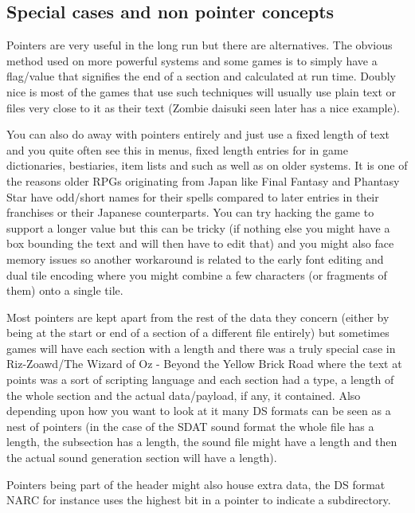\documentclass[
]{book}
\begin{document}
\hypertarget{special-cases-and-non-pointer-concepts}{%
\subsection{Special cases and non pointer concepts}\label{special-cases-and-non-pointer-concepts}}

Pointers are very useful in the long run but there are alternatives. The obvious method used on more powerful systems and some games is to simply have a flag/value that signifies the end of a section and calculated at run time. Doubly nice is most of the games that use such techniques will usually use plain text or files very close to it as their text (Zombie daisuki seen later has a nice example).

You can also do away with pointers entirely and just use a fixed length of text and you quite often see this in menus, fixed length entries for in game dictionaries, bestiaries, item lists and such as well as on older systems. It is one of the reasons older RPGs originating from Japan like Final Fantasy and Phantasy Star have odd/short names for their spells compared to later entries in their franchises or their Japanese counterparts. You can try hacking the game to support a longer value but this can be tricky (if nothing else you might have a box bounding the text and will then have to edit that) and you might also face memory issues so another workaround is related to the early font editing and dual tile encoding where you might combine a few characters (or fragments of them) onto a single tile.

Most pointers are kept apart from the rest of the data they concern (either by being at the start or end of a section of a different file entirely) but sometimes games will have each section with a length and there was a truly special case in Riz-Zoawd/The Wizard of Oz - Beyond the Yellow Brick Road where the text at points was a sort of scripting language and each section had a type, a length of the whole section and the actual data/payload, if any, it contained. Also depending upon how you want to look at it many DS formats can be seen as a nest of pointers (in the case of the SDAT sound format the whole file has a length, the subsection has a length, the sound file might have a length and then the actual sound generation section will have a length).

Pointers being part of the header might also house extra data, the DS format NARC for instance uses the highest bit in a pointer to indicate a subdirectory.
\end{document}

